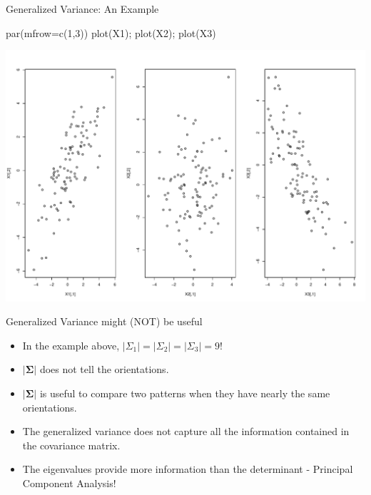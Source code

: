 \documentclass[
  ignorenonframetext,
]{beamer}
\newenvironment{Shaded}{\begin{snugshade}}{\end{snugshade}}
\newcommand{\AttributeTok}[1]{\textcolor[rgb]{0.77,0.63,0.00}{#1}}
\newcommand{\DecValTok}[1]{\textcolor[rgb]{0.00,0.00,0.81}{#1}}
\newcommand{\FunctionTok}[1]{\textcolor[rgb]{0.00,0.00,0.00}{#1}}
\newcommand{\NormalTok}[1]{#1}
\providecommand{\tightlist}{%
  \setlength{\itemsep}{0pt}\setlength{\parskip}{0pt}}
\begin{document}
\begin{frame}[fragile]{Generalized Variance: An Example}
\protect\hypertarget{generalized-variance-an-example-1}{}
\begin{Shaded}
\begin{Highlighting}[]
\FunctionTok{par}\NormalTok{(}\AttributeTok{mfrow=}\FunctionTok{c}\NormalTok{(}\DecValTok{1}\NormalTok{,}\DecValTok{3}\NormalTok{))}
\FunctionTok{plot}\NormalTok{(X1); }\FunctionTok{plot}\NormalTok{(X2); }\FunctionTok{plot}\NormalTok{(X3)}
\end{Highlighting}
\end{Shaded}

\includegraphics[width=1\linewidth,height=0.5\textheight]{Lecture04_ARandomSampleFromMultivariate_files/figure-beamer/unnamed-chunk-11-1}
\end{frame}

\begin{frame}{Generalized Variance might (NOT) be useful}
\protect\hypertarget{generalized-variance-might-not-be-useful}{}
\begin{itemize}
\tightlist
\item
  In the example above, \(|\Sigma_1|=|\Sigma_2|=|\Sigma_3|=9\)!
\item
  \(|\boldsymbol \Sigma|\) does not tell the orientations.
\item
  \(|\boldsymbol \Sigma|\) is useful to compare two patterns when they
  have nearly the same orientations.
\item
  The generalized variance does not capture all the information
  contained in the covariance matrix.
\item
  The eigenvalues provide more information than the determinant -
  Principal Component Analysis!
\end{itemize}
\end{frame}
\end{document}
